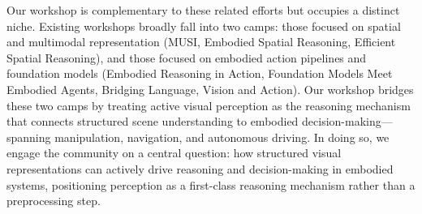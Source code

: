 \documentclass[runningheads]{llncs}
\begin{document}
\vspace{-1em}
\noindent
Our workshop is complementary to these related efforts but occupies a distinct niche. Existing workshops broadly fall into two camps: those focused on spatial and multimodal representation (MUSI, Embodied Spatial Reasoning, Efficient Spatial Reasoning), and those focused on embodied action pipelines and foundation models (Embodied Reasoning in Action, Foundation Models Meet Embodied Agents, Bridging Language, Vision and Action). Our workshop bridges these two camps by treating active visual perception as the reasoning mechanism that connects structured scene understanding to embodied decision-making—spanning manipulation, navigation, and autonomous driving. In doing so, we engage the community on a central question: how structured visual representations can actively drive reasoning and decision-making in embodied systems, positioning perception as a first-class reasoning mechanism rather than a preprocessing step.
\end{document}
